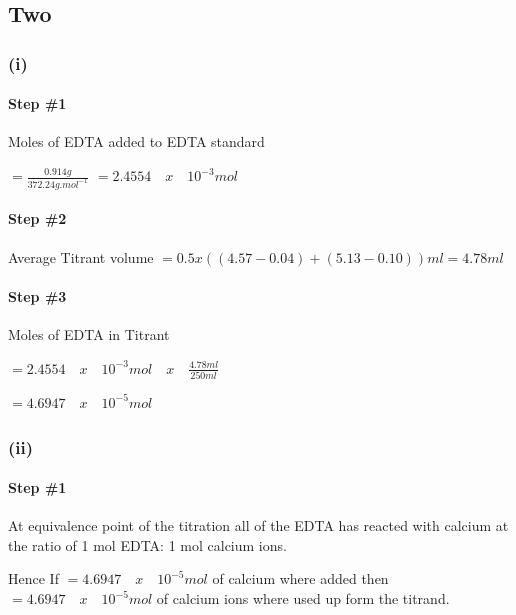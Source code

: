 \documentclass[]{article}
\let\oldparagraph\paragraph
\renewcommand{\paragraph}[1]{\oldparagraph{#1}\mbox{}}
\begin{document}
\hypertarget{two}{%
\subsection{Two}\label{two}}

\hypertarget{i}{%
\subsubsection{(i)}\label{i}}

\hypertarget{step-1-3}{%
\paragraph{Step \#1}\label{step-1-3}}

Moles of EDTA added to EDTA standard

\(= \frac{0.914g}{372.24g.mol^{-1}}\)
\(= 2.4554 \quad x \quad 10^{-3}mol\)

\hypertarget{step-2-3}{%
\paragraph{Step \#2}\label{step-2-3}}

Average Titrant volume \(= 0.5x ((4.57-0.04)+(5.13-0.10))ml= 4.78ml\)

\hypertarget{step-3-3}{%
\paragraph{Step \#3}\label{step-3-3}}

Moles of EDTA in Titrant

\(= 2.4554 \quad x \quad 10^{-3}mol \quad x \quad \frac{4.78ml}{250ml}\)

\(= 4.6947 \quad x \quad 10^{-5}mol\)

\hypertarget{ii}{%
\subsubsection{(ii)}\label{ii}}

\hypertarget{step-1-4}{%
\paragraph{Step \#1}\label{step-1-4}}

At equivalence point of the titration all of the EDTA has reacted with
calcium at the ratio of 1 mol EDTA: 1 mol calcium ions.

Hence If \(= 4.6947 \quad x \quad 10^{-5}mol\) of calcium where added
then \(= 4.6947 \quad x \quad 10^{-5}mol\) of calcium ions where used up
form the titrand.
\end{document}
